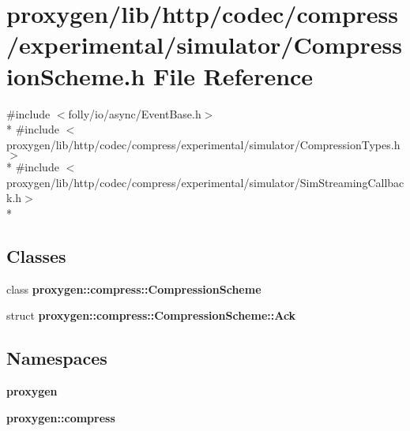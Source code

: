 \section{proxygen/lib/http/codec/compress/experimental/simulator/\+Compression\+Scheme.h File Reference}
\label{CompressionScheme_8h}
{\ttfamily \#include $<$folly/io/async/\+Event\+Base.\+h$>$}\\*
{\ttfamily \#include $<$proxygen/lib/http/codec/compress/experimental/simulator/\+Compression\+Types.\+h$>$}\\*
{\ttfamily \#include $<$proxygen/lib/http/codec/compress/experimental/simulator/\+Sim\+Streaming\+Callback.\+h$>$}\\*
\subsection*{Classes}
\begin{DoxyCompactItemize}
\item 
class {\bf proxygen\+::compress\+::\+Compression\+Scheme}
\item 
struct {\bf proxygen\+::compress\+::\+Compression\+Scheme\+::\+Ack}
\end{DoxyCompactItemize}
\subsection*{Namespaces}
\begin{DoxyCompactItemize}
\item 
 {\bf proxygen}
\item 
 {\bf proxygen\+::compress}
\end{DoxyCompactItemize}

